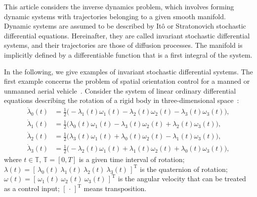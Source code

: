 \documentclass[10pt,reqno]{amsart}
\newcommand{\trans}{{\scriptscriptstyle \mathrm{T}}}
\theoremstyle{plain}
\theoremstyle{remark}
\begin{document}
This article considers the inverse dynamics problem, which involves forming dynamic systems with trajectories belonging to a given smooth manifold. Dynamic systems are assumed to be described by It\^o or Stratonovich stochastic differential equations. Hereinafter, they are called invariant stochastic differential systems, and their trajectories are those of diffusion processes. The manifold is implicitly defined by a differentiable function that is a first integral of the system.

In the following, we give examples of invariant stochastic differential systems. The first example concerns the problem of spatial orientation control for a manned or unmanned aerial vehicle~\cite{CarAbaGar_IJC22, UnlGul_JA25}. Consider the system of linear ordinary differential equations describing the rotation of a rigid body in three-dimensional space~\cite{SapMol_AT21, Lev_TSU23}:
\begin{equation}\label{eqSolid1}
  \begin{aligned}
    \dot\lambda_0(t) & = \tfrac{1}{2} \bigl( -\lambda_1(t) \omega_1(t) - \lambda_2(t) \omega_2(t) - \lambda_3(t) \omega_3(t) \bigr), \\
    \dot\lambda_1(t) & = \tfrac{1}{2} \bigl( \lambda_0(t) \omega_1(t) - \lambda_3(t) \omega_2(t) + \lambda_2(t) \omega_3(t) \bigr), \\
    \dot\lambda_2(t) & = \tfrac{1}{2} \bigl( \lambda_3(t) \omega_1(t) + \lambda_0(t) \omega_2(t) - \lambda_1(t) \omega_3(t) \bigr), \\
    \dot\lambda_3(t) & = \tfrac{1}{2} \bigl( -\lambda_2(t) \omega_1(t) + \lambda_1(t) \omega_2(t) + \lambda_0(t) \omega_3(t) \bigr),
  \end{aligned}
\end{equation}
where $t \in \mathds{T}$, $\mathds{T} = [0,T]$ is a given time interval of rotation; $\lambda(t) = [ \, \lambda_0(t) ~ \lambda_1(t) ~ \lambda_2(t) ~ \lambda_3(t) \, ]^\trans$ is the quaternion of rotation; $\omega(t) = [\, \omega_1(t) ~ \omega_2(t) ~ \omega_3(t) \, ]^\trans$ is the angular velocity that can be treated as a control input; $[\,\cdot\,]^\trans$ means transposition.
\end{document}
